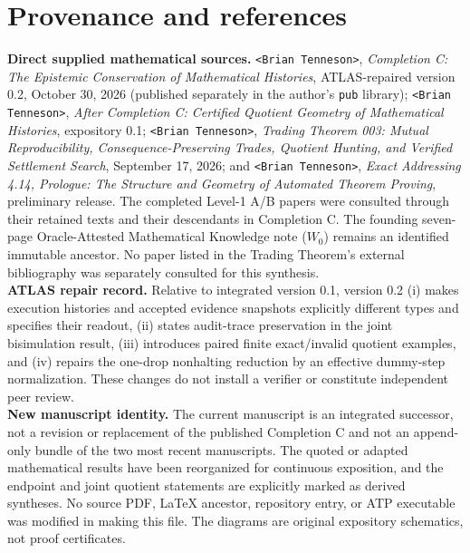 \documentclass[11pt,letterpaper]{article}
\theoremstyle{definition}
\begin{document}
\section*{Provenance and references}
\noindent\textbf{Direct supplied mathematical sources.} \texttt{<Brian Tenneson>}, \emph{Completion C: The Epistemic Conservation of Mathematical Histories}, ATLAS-repaired version 0.2, October 30, 2026 (published separately in the author's \texttt{pub} library); \texttt{<Brian Tenneson>}, \emph{After Completion C: Certified Quotient Geometry of Mathematical Histories}, expository 0.1; \texttt{<Brian Tenneson>}, \emph{Trading Theorem 003: Mutual Reproducibility, Consequence-Preserving Trades, Quotient Hunting, and Verified Settlement Search}, September 17, 2026; and \texttt{<Brian Tenneson>}, \emph{Exact Addressing 4.14, Prologue: The Structure and Geometry of Automated Theorem Proving}, preliminary release. The completed Level-1 A/B papers were consulted through their retained texts and their descendants in Completion C. The founding seven-page Oracle-Attested Mathematical Knowledge note ($W_0$) remains an identified immutable ancestor. No paper listed in the Trading Theorem's external bibliography was separately consulted for this synthesis.\\[5pt]
\noindent\textbf{ATLAS repair record.} Relative to integrated version 0.1, version 0.2 (i) makes execution histories and accepted evidence snapshots explicitly different types and specifies their readout, (ii) states audit-trace preservation in the joint bisimulation result, (iii) introduces paired finite exact/invalid quotient examples, and (iv) repairs the one-drop nonhalting reduction by an effective dummy-step normalization. These changes do not install a verifier or constitute independent peer review.\\[5pt]
\noindent\textbf{New manuscript identity.} The current manuscript is an integrated successor, not a revision or replacement of the published Completion C and not an append-only bundle of the two most recent manuscripts. The quoted or adapted mathematical results have been reorganized for continuous exposition, and the endpoint and joint quotient statements are explicitly marked as derived syntheses. No source PDF, LaTeX ancestor, repository entry, or ATP executable was modified in making this file. The diagrams are original expository schematics, not proof certificates.
\end{document}
